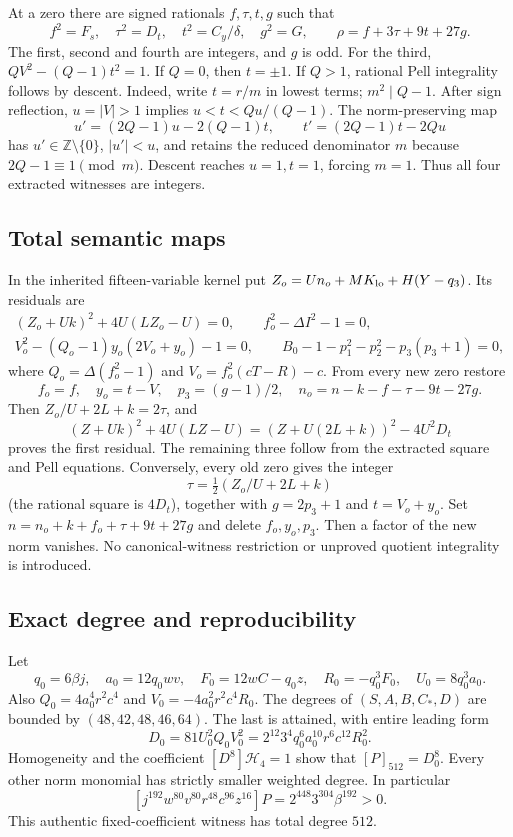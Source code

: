 At a zero there are signed rationals $f,\tau,t,g$ such that
\[
 f^2=F_s,\quad\tau^2=D_t,\quad t^2=C_y/\delta,\quad g^2=G,
 \qquad \rho=f+3\tau+9t+27g.
\]
The first, second and fourth are integers, and $g$ is odd. For the third,
$QV^2-(Q-1)t^2=1$. If $Q=0$, then $t=\pm1$. If $Q>1$, rational Pell
integrality follows by descent. Indeed, write $t=r/m$ in lowest terms;
$m^2\mid Q-1$. After sign reflection, $u=|V|>1$ implies
$u<t<Qu/(Q-1)$. The norm-preserving map
\[
 u'=(2Q-1)u-2(Q-1)t,\qquad t'=(2Q-1)t-2Qu
\]
has $u'\in\mathbb Z\setminus\{0\}$, $|u'|<u$, and retains the reduced
denominator $m$ because $2Q-1\equiv1\pmod m$. Descent reaches $u=1,t=1$,
forcing $m=1$. Thus all four extracted witnesses are integers.

\subsection{Total semantic maps}
In the inherited fifteen-variable kernel put
$Z_o=Un_o+MK_{\rm lo}+H(Y-q_3)$. Its residuals are
\begin{gather*}
 (Z_o+Uk)^2+4U(LZ_o-U)=0,\qquad f_o^2-\Delta I^2-1=0,\\
 V_o^2-(Q_o-1)y_o(2V_o+y_o)-1=0,\qquad
 B_0-1-p_1^2-p_2^2-p_3(p_3+1)=0,
\end{gather*}
where $Q_o=\Delta(f_o^2-1)$ and $V_o=f_o^2(cT-R)-c$.
From every new zero restore
\[
 f_o=f,\quad y_o=t-V,\quad p_3=(g-1)/2,\quad
 n_o=n-k-f-\tau-9t-27g.
\]
Then $Z_o/U+2L+k=2\tau$, and
\[
 (Z+Uk)^2+4U(LZ-U)=(Z+U(2L+k))^2-4U^2D_t
\]
proves the first residual. The remaining three follow from the extracted
square and Pell equations. Conversely, every old zero gives the integer
\[
 \tau=\tfrac12(Z_o/U+2L+k)
\]
(the rational square is $4D_t$), together with $g=2p_3+1$ and $t=V_o+y_o$.
Set $n=n_o+k+f_o+\tau+9t+27g$ and delete $f_o,y_o,p_3$.
Then a factor of the new norm vanishes. No canonical-witness restriction or
unproved quotient integrality is introduced.

\subsection{Exact degree and reproducibility}
Let
\[
 q_0=6\beta j,\quad a_0=12q_0wv,\quad
 F_0=12wC-q_0z,\quad R_0=-q_0^3F_0,\quad U_0=8q_0^3a_0.
\]
Also $Q_0=4a_0^4r^2c^4$ and $V_0=-4a_0^2r^2c^4R_0$.
The degrees of $(S,A,B,C_*,D)$ are bounded by $(48,42,48,46,64)$.
The last is attained, with entire leading form
\[
 D_0=81U_0^2Q_0V_0^2
     =2^{12}3^4q_0^6a_0^{10}r^6c^{12}R_0^2.
\]
Homogeneity and the coefficient $[D^8]\mathcal H_4=1$ show that
$[P]_{512}=D_0^8$. Every other norm monomial has strictly smaller weighted
degree. In particular
\[
 [j^{192}w^{80}v^{80}r^{48}c^{96}z^{16}]P
       =2^{448}3^{304}\beta^{192}>0.
\]
This authentic fixed-coefficient witness has total degree $512$.

